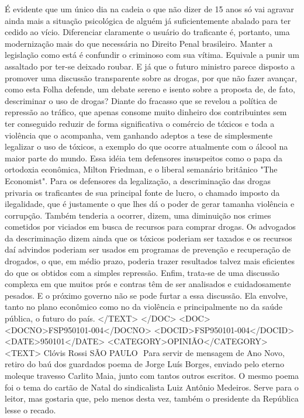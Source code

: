 É evidente que um único dia na cadeia o que não dizer de 15 anos só vai agravar ainda mais a situação psicológica de alguém já suficientemente abalado para ter cedido ao vício.
Diferenciar claramente o usuário do traficante é, portanto, uma modernização mais do que necessária no Direito Penal brasileiro. Manter a legislação como está é confundir o criminoso com sua vítima. Equivale a punir um assaltado por ter-se deixado roubar.
E já que o futuro ministro parece disposto a promover uma discussão transparente sobre as drogas, por que não fazer avançar, como esta Folha defende, um debate sereno e isento sobre a proposta de, de fato, descriminar o uso de drogas?
Diante do fracasso que se revelou a política de repressão ao tráfico, que apenas consome muito dinheiro dos contribuintes sem ter conseguido reduzir de forma significativa o comércio de tóxicos e toda a violência que o acompanha, vem ganhando adeptos a tese de simplesmente legalizar o uso de tóxicos, a exemplo do que ocorre atualmente com o álcool na maior parte do mundo. Essa idéia tem defensores insuspeitos como o papa da ortodoxia econômica, Milton Friedman, e o liberal semanário britânico "The Economist".
Para os defensores da legalização, a descriminação das drogas privaria os traficantes de sua principal fonte de lucro, o chamado imposto da ilegalidade, que é justamente o que lhes dá o poder de gerar tamanha violência e corrupção. Também tenderia a ocorrer, dizem, uma diminuição nos crimes cometidos por viciados em busca de recursos para comprar drogas.
Os advogados da descriminação dizem ainda que os tóxicos poderiam ser taxados e os recursos daí advindos poderiam ser usados em programas de prevenção e recuperação de drogados, o que, em médio prazo, poderia trazer resultados talvez mais eficientes do que os obtidos com a simples repressão.
Enfim, trata-se de uma discussão complexa em que muitos prós e contras têm de ser analisados e cuidadosamente pesados. E o próximo governo não se pode furtar a essa discussão. Ela envolve, tanto no plano econômico como no da violência e principalmente no da saúde pública, o futuro do país.
</TEXT>
</DOC>
<DOC>
<DOCNO>FSP950101-004</DOCNO>
<DOCID>FSP950101-004</DOCID>
<DATE>950101</DATE>
<CATEGORY>OPINIÃO</CATEGORY>
<TEXT>
Clóvis Rossi 
SÃO PAULO  Para servir de mensagem de Ano Novo, retiro do baú dos guardados poema de Jorge Luís Borges, enviado pelo eterno moleque travesso Carlito Maia, junto com tantos outros escritos. O mesmo poema foi o tema do cartão de Natal do sindicalista Luiz Antônio Medeiros.
Serve para o leitor, mas gostaria que, pelo menos desta vez, também o presidente da República lesse o recado.
